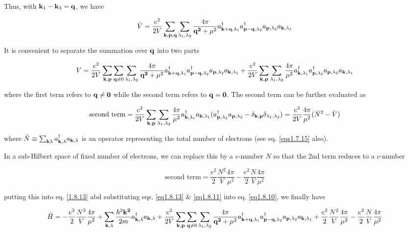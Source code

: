 Thus, with ${\bf k}_1 - {\bf k}_3 = \bf q$, we have

\begin{align}
\hat{V}=\frac{e^2}{2V}\sum_{\bf k,p,q}\sum_{\lambda_1,\lambda_2}\frac{4\pi}{{\bf q^2}+\mu^2}a^\dagger_{{\bf k+q},\lambda_1}a^\dagger_{{\bf p-q},\lambda_2}a_{{\bf p},\lambda_2}a_{{\bf k},\lambda_1}
\end{align}

It is convenient to separate the summation over $\bf q$ into two parts

\begin{align}\label{eq1.8.13}
V=\frac{e^2}{2V}\sum_{\bf k,p}\sum_{{\bf q}\neq0}\sum_{\lambda_1,\lambda_2}\frac{4\pi}{{\bf q^2}+\mu^2}a^\dagger_{{\bf k+q},\lambda_1}a^\dagger_{{\bf p-q},\lambda_2}a_{{\bf p},\lambda_2}a_{{\bf k},\lambda_1} + \frac{e^2}{2V}\sum_{\bf k,p}\sum_{\lambda_1,\lambda_2}\frac{4\pi}{\mu^2}a^\dagger_{{\bf k},\lambda_1}a^\dagger_{{\bf p},\lambda_2}a_{{\bf p},\lambda_2}a_{{\bf k},\lambda_1}
\end{align}

where the first term refers to $\bf q\neq0$ while the second term refers to $\bf q=0$. The second term can be further evaluated as 

\[\text{second term}= \frac{e^2}{2V}\sum_{\bf k,p}\sum_{\lambda_1,\lambda_2}\frac{4\pi}{\mu^2}a^\dagger_{{\bf k},\lambda_1}a_{{\bf k},\lambda_1}(a^\dagger_{{\bf p},\lambda_2}a_{{\bf p},\lambda_2}-\delta_{\bf k,p}\delta_{\lambda_1,\lambda_2}) = \frac{e^2}{2V}\frac{4\pi}{\mu^2}(\hat{N}^2-\hat{V})\]

where $\hat{N}\equiv\sum_{{\bf k}\lambda}a_{{\bf k},\lambda}^\dagger a_{{\bf k},\lambda}$ is an operator representing the total number of electrons (see eq. \eqref{eqs1.7.15} also). 

In a sub-Hilbert space of fixed number of electrons, we can replace this by a $c$-number $N$ so that the $2$nd term reduces to a $c$-number

\[\text{second term}=\frac{e^2}{2}\frac{N^2}{V}\frac{4\pi}{\mu^2}-\frac{e^2}{2}\frac{N}{V}\frac{4\pi}{\mu^2}\]

putting this into eq. \eqref{1.8.13} abd substituting eqs. \eqref{eq1.8.13} \& \eqref{eq1.8.11} into eq. \eqref{eq1.8.10}, we finally have

\[\hat{H}=-\frac{e^2}{2}\frac{N^2}{V}\frac{4\pi}{\mu^2}+\sum_{{\bf k},\lambda}\frac{\hbar^2\bf k^2}{2m}a^\dagger_{{\bf k},\lambda}a_{{\bf k},\lambda}+\frac{e^2}{2V}\sum_{\bf k,p} \sum_{{\bf q}\neq0}\sum_{\lambda_1,\lambda_2}\frac{4\pi}{{\bf q^2}+\mu^2}a^\dagger_{{\bf k+q},\lambda_1}a^\dagger_{{\bf p-q},\lambda_2}a_{{\bf p},\lambda_2}a_{{\bf k},\lambda_1} + \frac{e^2}{2}\frac{N^2}{V}\frac{4\pi}{\mu^2}-\frac{e^2}{2}\frac{N}{V}\frac{4\pi}{\mu^2} \]

